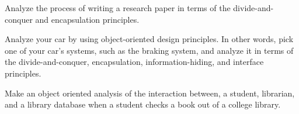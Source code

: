 \begin{EXRtwo}
\item  Analyze the process of writing a research paper
in terms of the divide-and-conquer and encapsulation principles.

\item  Analyze your car by using object-oriented design
principles. In other words, pick one of your car's systems, such as
the braking system, and analyze it in terms of the divide-and-conquer,
encapsulation, information-hiding, and interface principles.

\item Make an object oriented analysis of the interaction between,
a student, librarian, and a library database when a student checks
a book out of a college library.

\end{EXRtwo}



